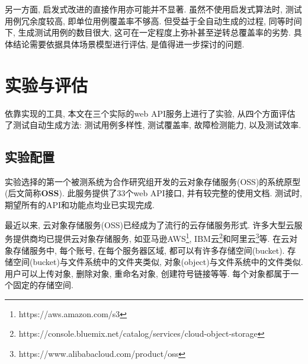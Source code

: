        另一方面, 启发式改进的直接作用亦可能并不显著. 虽然不使用启发式算法时, 测试用例冗余度较高, 即单位用例覆盖率不够高. 但受益于全自动生成的过程, 同等时间下, 生成测试用例的数目很大, 这可在一定程度上弥补甚至逆转总覆盖率的劣势. 具体结论需要依据具体场景模型进行评估, 是值得进一步探讨的问题.
    

    \section{实验与评估}

        \label{sec:experiment}

        依靠实现的工具, 本文在三个实际的web API服务上进行了实验, 从四个方面评估了测试自动生成方法: 测试用例多样性, 测试覆盖率, 故障检测能力, 以及测试效率.
    
        \subsection{实验配置}
            实验选择的第一个被测系统为合作研究组开发的云对象存储服务(OSS)的系统原型(后文简称\textbf{OSS}). 此服务提供了33个web API接口, 并有较完整的使用文档. 测试时, 期望所有的API和功能点均业已实现完成.
            
            最近以来, 云对象存储服务(OSS)已经成为了流行的云存储服务形式. 许多大型云服务提供商均已提供云对象存储服务, 如亚马逊AWS\footnote{https://aws.amazon.com/s3}, IBM云\footnote{ https://console.bluemix.net/catalog/services/cloud-object-storage}和阿里云\footnote{ https://www.alibabacloud.com/product/oss}等. 在云对象存储服务中, 每个账号, 在每个服务器区域, 都可以有许多存储空间(bucket). 存储空间(bucket)与文件系统中的文件夹类似, 对象(object)与文件系统中的文件类似. 用户可以上传对象, 删除对象, 重命名对象, 创建符号链接等等. 每个对象都属于一个固定的存储空间.
            
